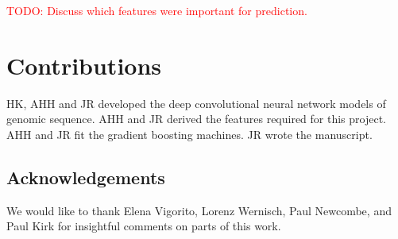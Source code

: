 \documentclass{article}
\newcommand{\todo}[1]{\textcolor{red}{TODO: #1}}
\begin{document}
\todo{Discuss which features were important for prediction.}


\section*{Contributions}

HK, AHH and JR developed the deep convolutional neural network models of
genomic sequence. AHH and JR derived the features required for this
project. AHH and JR fit the gradient boosting machines. JR wrote the
manuscript.


\subsection*{Acknowledgements}

We would like to thank Elena Vigorito, Lorenz Wernisch, Paul Newcombe, and Paul
Kirk for insightful comments on parts of this work.

%
%
\printbibliography
\end{document}
